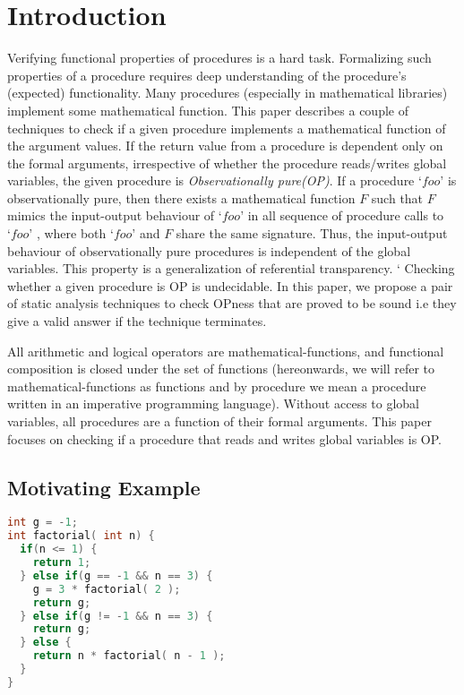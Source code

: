 \documentclass{llncs}
\newcommand{\foo}{\textit{`foo'}}
\newcommand{\F}{\mathit{F}}
\begin{document}


\section{Introduction}
Verifying functional properties of procedures is a hard task.
Formalizing such properties of a procedure requires deep understanding
of the procedure's (expected) functionality. Many procedures
(especially in mathematical libraries) implement some mathematical
function. This paper describes a couple of techniques to check if a
given procedure implements a mathematical function of the argument
values. If the return value from a procedure is dependent only on the
formal arguments, irrespective of whether the procedure reads/writes
global variables,
the given procedure is \textit{Observationally pure(OP)}.  If a
procedure $\foo$ is observationally pure, then there exists a
mathematical function $\F$ such that $\F$ mimics the input-output
behaviour of $\foo$ in all sequence of procedure calls to $\foo$ ,
where both $\foo$ and $\F$ share the same signature. Thus, the
input-output behaviour of observationally pure procedures is
independent of the global variables. This property is a generalization
of referential transparency.
`%
Checking whether a given procedure is OP is undecidable. In this
paper, we propose a pair of static analysis techniques to check OPness
that are proved to be sound i.e they give a valid answer if the
technique terminates.

All arithmetic and logical operators are mathematical-functions, and
functional composition is closed under the set of functions
(hereonwards, we will refer to mathematical-functions as functions and
by procedure we mean a procedure written in an imperative programming
language). Without access to global variables, all procedures are a
function of their formal arguments. This paper focuses on checking if
a procedure that reads and writes global variables is OP.

\subsection{Motivating Example}

\begin{lstlisting}[language=c, caption= {Procedure `factorial' :
      returns factorial of `n' and memoizes result for argument value
      `3'.}, label=lst:factorialSimple]
int g = -1;
int factorial( int n) {
  if(n <= 1) {
    return 1;
  } else if(g == -1 && n == 3) {
    g = 3 * factorial( 2 );
    return g;
  } else if(g != -1 && n == 3) {
    return g;
  } else {
    return n * factorial( n - 1 );
  }
}
\end{lstlisting}
\end{document}

